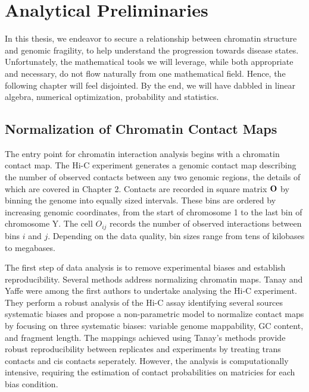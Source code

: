 
\chapter{Analytical Preliminaries}

In this thesis, we endeavor to secure a relationship between chromatin structure and genomic fragility, to help understand the
progression towards disease states.  Unfortunately, the mathematical tools we will leverage, while both appropriate and necessary,
do not flow naturally from one mathematical field.  Hence, the following chapter will feel disjointed.  By the end, we will have
dabbled in linear algebra, numerical optimization, probability and statistics.

\section*{Normalization of Chromatin Contact Maps}

The entry point for chromatin interaction analysis begins with a chromatin \gls{contact map}.  The Hi-C experiment generates a
genomic contact map describing the number of observed contacts between any two genomic regions, the details of which are covered
in Chapter 2.  Contacts are recorded in square matrix $\mathbf{O}$ by binning the genome into equally sized intervals.  These bins
are ordered by increasing genomic coordinates, from the start of chromosome 1 to the last bin of chromosome Y.  The cell $O_{ij}$
records the number of observed interactions between bins $i$ and $j$.  Depending on the data quality, bin sizes range from tens of
kilobases to megabases.

The first step of data analysis is to remove experimental biases and establish reproducibility.  Several methods address
normalizing chromatin maps.  Tanay and Yaffe were among the first authors to undertake analysing the Hi-C experiment\cite{yaffe2011}.
They perform a robust analysis of the Hi-C assay identifying several sources systematic biases and propose a non-parametric model
to normalize contact maps by focusing on three systematic biases: variable genome mappability, \gls{GC} content, and fragment length.
The mappings achieved using Tanay's methods provide robust reproducibility between replicates and experiments by treating
\gls{trans contacts} and \gls{cis contacts} seperately\cite{yaffe2011}.  However, the analysis is computationally intensive, requiring
the estimation of contact probabilities on matricies for each bias condition.

